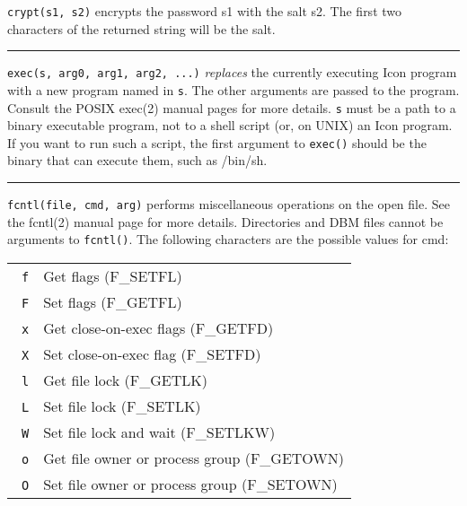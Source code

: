 \noindent
\texttt{crypt(s1, s2)} encrypts the password s1 with the salt s2. The first two
characters of the returned string will be the salt.

\bigskip\hrule\vspace{0.1cm}

\noindent
\texttt{exec(s, arg0, arg1, arg2, ...)}
\textit{replaces} the currently executing
Icon program with a new program named in \texttt{s}. The other arguments are
passed to the program. Consult the POSIX exec(2) manual pages for more
details. \texttt{s} must be a path to a binary executable program, not
to a shell script (or, on UNIX) an Icon program. If you want to run
such a script, the first argument to \texttt{exec()} should be the binary that
can execute them, such as /bin/sh.

\bigskip\hrule\vspace{0.1cm}

\noindent
\texttt{fcntl(file, cmd, arg)} performs miscellaneous operations on the open
file. See the fcntl(2) manual page for more details. Directories and
DBM files cannot be arguments to \texttt{fcntl()}. The following characters are
the possible values for cmd:

\begin{flushleft}
\begin{xtabular}{m{3.00cm}m{9.00cm}}
\ \texttt{f} & Get flags (F\_SETFL)\\
\ \texttt{F} & Set flags (F\_GETFL)\\
\ \texttt{x} & Get close-on-exec flags (F\_GETFD)\\
\ \texttt{X} & Set close-on-exec flag (F\_SETFD)\\
\ \texttt{l} & Get file lock (F\_GETLK)\\
\ \texttt{L} & Set file lock (F\_SETLK)\\
\ \texttt{W} & Set file lock and wait (F\_SETLKW)\\
\ \texttt{o} & Get file owner or process group (F\_GETOWN)\\
\ \texttt{O} & Set file owner or process group (F\_SETOWN)\\
\end{xtabular}
\end{flushleft}

